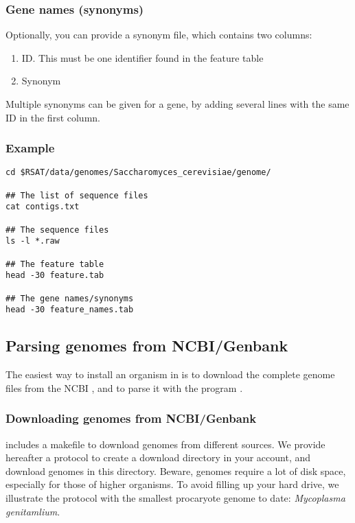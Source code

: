 \subsubsection{Gene names (synonyms)}

Optionally, you can provide a synonym file, which contains two
columns:

\begin{enumerate}
\item ID. This must be one identifier found in the feature table
\item Synonym
\end{enumerate}

Multiple synonyms can be given for a gene, by adding several lines with
the same ID in the first column.

\subsubsection{Example}

\begin{verbatim}
cd $RSAT/data/genomes/Saccharomyces_cerevisiae/genome/

## The list of sequence files
cat contigs.txt

## The sequence files
ls -l *.raw

## The feature table
head -30 feature.tab

## The gene names/synonyms
head -30 feature_names.tab

\end{verbatim}


\subsection{Parsing genomes from NCBI/Genbank}

The easiest way to install an organism in \RSAT is to download the
complete genome files from the NCBI
, and to parse it with the
program .

\subsubsection{Downloading genomes from NCBI/Genbank}

\RSAT includes a makefile to download genomes from different sources.
We provide hereafter a protocol to create a download directory in your
account, and download genomes in this directory. Beware, genomes
require a lot of disk space, especially for those of higher
organisms. To avoid filling up your hard drive, we illustrate the protocol
with the smallest procaryote genome to date: \textit{Mycoplasma
  genitamlium}.


